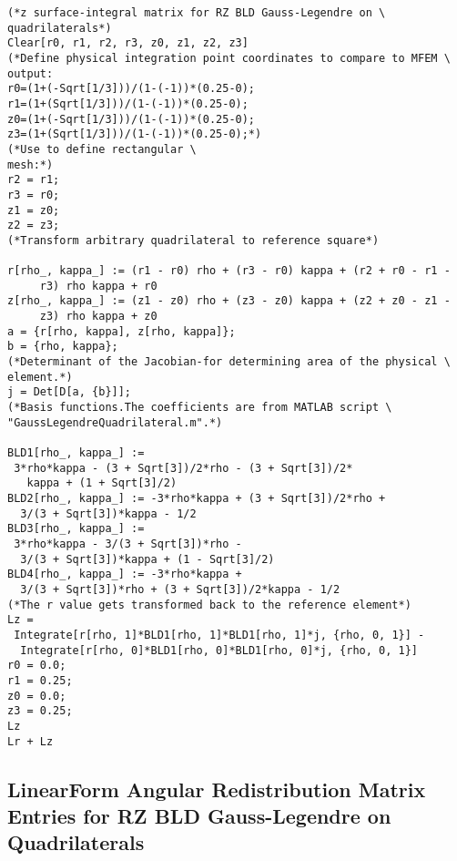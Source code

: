 \documentclass{article}
\begin{document}
\begin{verbatim}
(*z surface-integral matrix for RZ BLD Gauss-Legendre on \
quadrilaterals*)
Clear[r0, r1, r2, r3, z0, z1, z2, z3]
(*Define physical integration point coordinates to compare to MFEM \
output:
r0=(1+(-Sqrt[1/3]))/(1-(-1))*(0.25-0);
r1=(1+(Sqrt[1/3]))/(1-(-1))*(0.25-0);
z0=(1+(-Sqrt[1/3]))/(1-(-1))*(0.25-0);
z3=(1+(Sqrt[1/3]))/(1-(-1))*(0.25-0);*)
(*Use to define rectangular \
mesh:*)
r2 = r1;
r3 = r0;
z1 = z0;
z2 = z3;
(*Transform arbitrary quadrilateral to reference square*)

r[rho_, kappa_] := (r1 - r0) rho + (r3 - r0) kappa + (r2 + r0 - r1 - 
     r3) rho kappa + r0
z[rho_, kappa_] := (z1 - z0) rho + (z3 - z0) kappa + (z2 + z0 - z1 - 
     z3) rho kappa + z0
a = {r[rho, kappa], z[rho, kappa]};
b = {rho, kappa};
(*Determinant of the Jacobian-for determining area of the physical \
element.*)
j = Det[D[a, {b}]];
(*Basis functions.The coefficients are from MATLAB script \
"GaussLegendreQuadrilateral.m".*)

BLD1[rho_, kappa_] := 
 3*rho*kappa - (3 + Sqrt[3])/2*rho - (3 + Sqrt[3])/2*
   kappa + (1 + Sqrt[3]/2)
BLD2[rho_, kappa_] := -3*rho*kappa + (3 + Sqrt[3])/2*rho + 
  3/(3 + Sqrt[3])*kappa - 1/2
BLD3[rho_, kappa_] := 
 3*rho*kappa - 3/(3 + Sqrt[3])*rho - 
  3/(3 + Sqrt[3])*kappa + (1 - Sqrt[3]/2)
BLD4[rho_, kappa_] := -3*rho*kappa + 
  3/(3 + Sqrt[3])*rho + (3 + Sqrt[3])/2*kappa - 1/2
(*The r value gets transformed back to the reference element*)
Lz = 
 Integrate[r[rho, 1]*BLD1[rho, 1]*BLD1[rho, 1]*j, {rho, 0, 1}] - 
  Integrate[r[rho, 0]*BLD1[rho, 0]*BLD1[rho, 0]*j, {rho, 0, 1}]
r0 = 0.0;
r1 = 0.25;
z0 = 0.0;
z3 = 0.25;
Lz
Lr + Lz
\end{verbatim}

\subsection{LinearForm Angular Redistribution Matrix Entries for RZ BLD Gauss-Legendre on Quadrilaterals}
\end{document}

